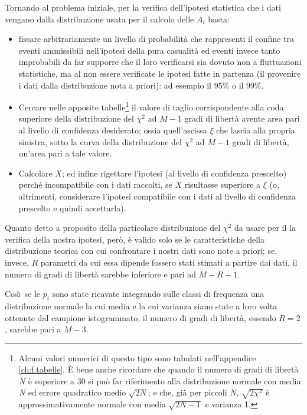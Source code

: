 Tornando al problema iniziale, per la verifica dell'ipotesi
statistica che i dati vengano dalla distribuzione usata per
il calcolo delle $A_i$ basta:
\begin{itemize}
\item fissare arbitrariamente un livello di probabilit\`a
  che rappresenti il confine tra eventi ammissibili
  nell'ipotesi della pura casualit\`a ed eventi invece tanto
  improbabili da far supporre che il loro verificarsi sia
  dovuto non a fluttuazioni statistiche, ma al non essere
  verificate le ipotesi fatte in partenza (il provenire i
  dati dalla distribuzione nota a priori): ad esempio il
  95\% o il 99\%.
\item Cercare nelle apposite tabelle\/\footnote{Alcuni
    valori numerici di questo tipo sono tabulati
    nell'appendice \ref{ch:f.tabelle}.  \`E bene anche
    ricordare che quando il numero di gradi di libert\`a $N$
    \`e superiore a 30 si pu\`o far riferimento alla
    distribuzione normale con media $N$ ed errore quadratico
    medio $\sqrt{2N}$; e che, gi\`a per piccoli $N$,
    $\sqrt{2\chi^2}$ \`e approssimativamente normale con
    media $\sqrt{2N-1}$ e varianza 1.} il valore di taglio
  corrispondente alla coda superiore della distribuzione del
  $\chi^2$ ad $M - 1$ gradi di libert\`a avente area pari al
  livello di confidenza desiderato; ossia quell'ascissa
  $\xi$ che lascia alla propria sinistra, sotto la curva
  della distribuzione del $\chi^2$ ad $M - 1$ gradi di
  libert\`a, un'area pari a tale valore.
\item Calcolare $X$; ed infine rigettare l'ipotesi (al
  livello di confidenza prescelto) perch\'e incompatibile
  con i dati raccolti, se $X$ risultasse superiore a $\xi$
  (o, altrimenti, considerare l'ipotesi compatibile con i
  dati al livello di confidenza prescelto e quindi
  accettarla).
\end{itemize}

Quanto detto a proposito della particolare distribuzione del
$\chi^2$ da usare per il la verifica della nostra ipotesi,
per\`o, \`e valido solo se le caratteristiche della
distribuzione teorica con cui confrontare i nostri dati sono
note a priori; se, invece, $R$ parametri da cui essa dipende
fossero stati stimati a partire dai dati, il numero di gradi
di libert\`a sarebbe inferiore e pari ad $M - R - 1$.

Cos\`\i\ se le $p_i$ sono state ricavate integrando sulle
classi di frequenza una distribuzione normale la cui media e
la cui varianza siano state a loro volta ottenute dal
campione istogrammato, il numero di gradi di libert\`a,
essendo $R=2$, sarebbe pari a $M - 3$.

